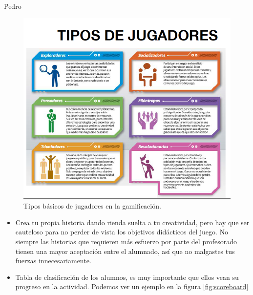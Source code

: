 \begin{opin}{\pedrocolor}{Pedro}
\begin{leftbar}{\pedrocolor}
\begin{itemize}
\end{itemize}
\vspace{2cm}
\end{leftbar}
\vspace{-2cm}
\begin{figure}[hbt]
\begin{leftbar}{\pedrocolor}
\centering
\includegraphics[scale=0.4]{img/gamingpedro2.png}
\caption{Tipos básicos de jugadores en la gamificación.}
\label{fig:tiposJug}
\vspace{2cm}
\end{leftbar}
\vspace{-2cm}
\end{figure}
\vspace{-1cm}
\begin{leftbar}{\pedrocolor}

\begin{itemize}



\item Crea tu propia historia dando rienda suelta a tu creatividad, pero hay que ser cauteloso para no perder de vista los objetivos didácticos del juego. No siempre las historias que requieren más esfuerzo por parte del profesorado tienen una mayor aceptación entre el alumnado, así que no malgastes tus fuerzas innecesariamente. 

\item Tabla de clasificación de los alumnos, es muy importante que ellos vean su progreso en la actividad. 
%
Podemos ver un ejemplo en la figura \ref{fig:scoreboard}


\end{itemize}
\end{leftbar}
\end{opin}
